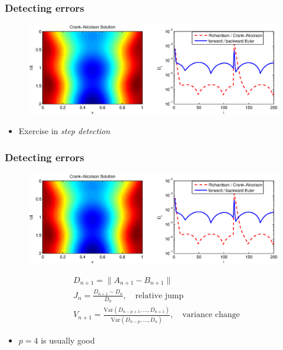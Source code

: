 \documentclass{beamer}
\begin{document}
%
\begin{frame}
\frametitle{Detecting errors}

\begin{figure}
  \centering
  \includegraphics[scale=0.5]{figs/heat_soln_diffs1.eps}
\end{figure}

\begin{itemize}
\item Exercise in \emph{step detection}
\end{itemize}

\end{frame}

\begin{frame}
\frametitle{Detecting errors}

\begin{figure}
  \centering
  \includegraphics[scale=0.5]{figs/heat_soln_diffs1.eps}
  \vspace{-1cm}
\end{figure}


\begin{align}
& D_{n+1} = \| A_{n+1} - B_{n+1} \| \nonumber \\
& J_{n} = \frac{D_{n+1} - D_n}{D_n}, \quad \text{relative jump} \nonumber \\
& V_{n+1} = \frac{\text{Var}(D_{n-p+1}, \ldots, D_{n+1})}{\text{Var}(D_{n-p}, \ldots, D_{n})}, \quad \text{variance change} \nonumber
\end{align}

\begin{itemize}
\item $p = 4$ is usually good
\end{itemize}


\end{frame}
\end{document}
